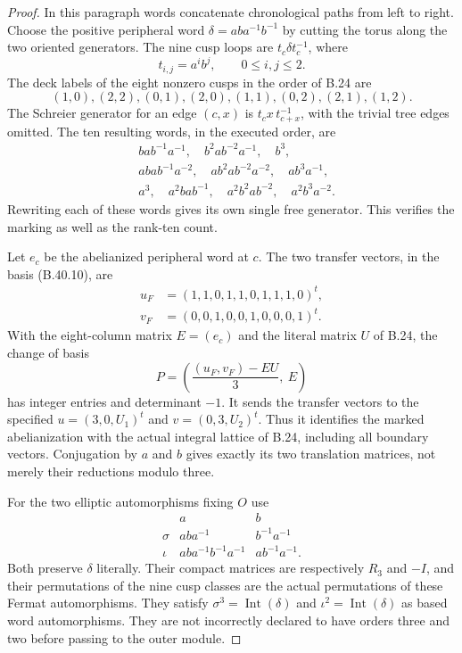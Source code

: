 \begin{proof}
In this paragraph words concatenate chronological paths
from left to right. Choose the positive peripheral word
$\delta=aba^{-1}b^{-1}$ by cutting the torus along the
two oriented generators. The nine cusp loops are
$t_c\delta t_c^{-1}$, where
\[
 t_{i,j}=a^ib^j,\qquad 0\le i,j\le2.
\]
The deck labels of the eight nonzero cusps in the order
of B.24 are
\[
 (1,0),(2,2),(0,1),(2,0),(1,1),(0,2),(2,1),(1,2).
                                                               \tag{B.40.9}
\]
The Schreier generator for an edge $(c,x)$ is
$t_cx\,t_{c+x}^{-1}$, with the trivial tree edges omitted.
The ten resulting words, in the executed order, are
\[
\begin{aligned}
 &bab^{-1}a^{-1},\quad b^2ab^{-2}a^{-1},\quad b^3,\\
 &abab^{-1}a^{-2},\quad ab^2ab^{-2}a^{-2},\quad ab^3a^{-1},\\
 &a^3,\quad a^2bab^{-1},\quad a^2b^2ab^{-2},\quad a^2b^3a^{-2}.
\end{aligned}                                                  \tag{B.40.10}
\]
Rewriting each of these words gives its own single free
generator. This verifies the marking as well as the
rank-ten count.

Let $e_c$ be the abelianized peripheral word at $c$.
The two transfer vectors, in the basis (B.40.10), are
\[
\begin{aligned}
 u_F&=(1,1,0,1,1,0,1,1,1,0)^t,\\
 v_F&=(0,0,1,0,0,1,0,0,0,1)^t.
\end{aligned}                                                  \tag{B.40.11}
\]
With the eight-column matrix $E=(e_c)$ and the literal
matrix $U$ of B.24, the change of basis
\[
       P=\left(\frac{(u_F,v_F)-EU}{3},\ E\right)              \tag{B.40.12}
\]
has integer entries and determinant $-1$.
It sends the transfer vectors to the specified
$u=(3,0,U_1)^t$ and $v=(0,3,U_2)^t$.
Thus it identifies the marked abelianization with the
actual integral lattice of B.24, including all boundary
vectors. Conjugation by $a$ and $b$ gives exactly its
two translation matrices, not merely their reductions
modulo three.

For the two elliptic automorphisms fixing $O$ use
\[
\begin{array}{c|cc}
 &a&b\\ \hline
 \sigma&aba^{-1}&b^{-1}a^{-1}\\
 \iota&aba^{-1}b^{-1}a^{-1}&ab^{-1}a^{-1}.
\end{array}                                                     \tag{B.40.13}
\]
Both preserve $\delta$ literally. Their compact matrices
are respectively $R_3$ and $-I$, and their permutations
of the nine cusp classes are the actual permutations
of these Fermat automorphisms.
They satisfy $\sigma^3=\operatorname{Int}(\delta)$ and
$\iota^2=\operatorname{Int}(\delta)$ as based word
automorphisms. They are not incorrectly declared to
have orders three and two before passing to the outer module.


\end{proof}
